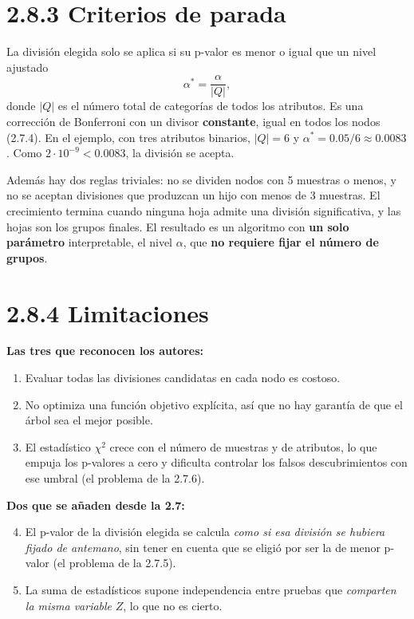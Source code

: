 \documentclass[11pt,a4paper]{article}
\begin{document}
\section{2.8.3 Criterios de parada}

La división elegida solo se aplica si su p-valor es menor o igual que un nivel
ajustado
\[
  \alpha^\ast=\frac{\alpha}{|Q|},
\]
donde $|Q|$ es el número total de categorías de todos los atributos. Es una
corrección de Bonferroni con un divisor \textbf{constante}, igual en todos los nodos
(2.7.4). En el ejemplo, con tres atributos binarios, $|Q|=6$ y
$\alpha^\ast=0.05/6\approx0.0083$. Como $2\cdot10^{-9}<0.0083$, la división se
acepta.

Además hay dos reglas triviales: no se dividen nodos con 5 muestras o menos, y no
se aceptan divisiones que produzcan un hijo con menos de 3 muestras. El crecimiento
termina cuando ninguna hoja admite una división significativa, y las hojas son los
grupos finales. El resultado es un algoritmo con \textbf{un solo parámetro}
interpretable, el nivel $\alpha$, que \textbf{no requiere fijar el número de
grupos}.

\section{2.8.4 Limitaciones}

\textbf{Las tres que reconocen los autores:}
\begin{enumerate}
  \item Evaluar todas las divisiones candidatas en cada nodo es costoso.
  \item No optimiza una función objetivo explícita, así que no hay garantía de que
  el árbol sea el mejor posible.
  \item El estadístico $\chi^2$ crece con el número de muestras y de atributos, lo
  que empuja los p-valores a cero y dificulta controlar los falsos descubrimientos
  con ese umbral (el problema de la 2.7.6).
\end{enumerate}
\textbf{Dos que se añaden desde la 2.7:}
\begin{enumerate}
  \setcounter{enumi}{3}
  \item El p-valor de la división elegida se calcula \emph{como si esa división se
  hubiera fijado de antemano}, sin tener en cuenta que se eligió por ser la de menor
  p-valor (el problema de la 2.7.5).
  \item La suma de estadísticos supone independencia entre pruebas que
  \emph{comparten la misma variable} $Z$, lo que no es cierto.
\end{enumerate}
\end{document}
